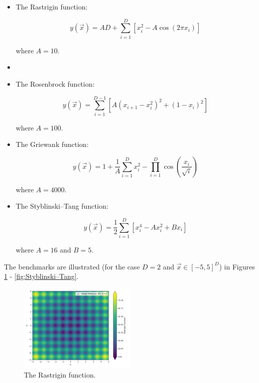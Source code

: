 \documentclass[conference]{IEEEtran}
\begin{document}
\begin{itemize}
	\item The Rastrigin function:
	
	\begin{equation}
		y(\vec{x}) = AD + \sum_{i=1}^{D}\left[x_i^2 - A\cos(2\pi x_i)\right]
		\label{eqn:Rastrigin}
	\end{equation}
	
	\noindent where $A = 10$.

	\item []
	\item The Rosenbrock function:
	
	\begin{equation}
		y(\vec{x}) = \sum_{i=1}^{D - 1}\left[A(x_{i + 1} - x_i^2)^2 + (1 - x_i)^2\right]
		\label{eqn:Rosenbrock}
	\end{equation}
	
	\noindent where $A = 100$.
	
	\item The Griewank function:
	
	\begin{equation}
		y(\vec{x}) = 1 + \frac{1}{A}\sum_{i=1}^{D}x_i^2 - \prod_{i=1}^{D}\cos\left(\frac{x_i}{\sqrt{i}}\right)
		\label{eqn:Griewank}
	\end{equation}
	
	\noindent where $A = 4000$.
	
	\item The Styblinski–Tang function:
	
	\begin{equation}
		y(\vec{x}) = \frac{1}{2}\sum_{i=1}^{D}\left[x_i^4 - Ax_i^2 + Bx_i\right]
		\label{eqn:Styblinski–Tang}
	\end{equation}
	
	\noindent where $A = 16$ and $B = 5$.
\end{itemize}

The benchmarks are illustrated (for the case $D = 2$ and $\vec{x} \in [-5, 5]^D$) in Figures \ref{fig:Rastrigin} - \ref{fig:Styblinski–Tang}.

\begin{figure}[htbp]
	\centerline{\includegraphics[width=0.5\textwidth]{test_Rastrigin.png}}
	\caption{The Rastrigin function.}
	\label{fig:Rastrigin}
\end{figure}
\end{document}

